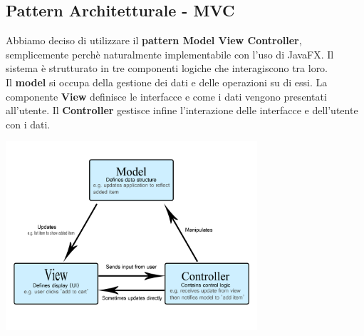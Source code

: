 \documentclass[11pt]{article}
\begin{document}
    \subsection{Pattern Architetturale - MVC}
    Abbiamo deciso di utilizzare il \textbf{pattern Model View Controller}, semplicemente perchè naturalmente implementabile con l'uso di JavaFX. Il sistema è strutturato in tre componenti logiche che interagiscono tra loro.\\
    Il \textbf{model} si occupa della gestione dei dati e delle operazioni su di essi. La componente \textbf{View} definisce le interfacce e come i dati vengono presentati all'utente. Il \textbf{Controller} 
    gestisce infine l'interazione delle interfacce e dell'utente con i dati.
        \begin{center}
            \includegraphics[width=0.70\textwidth]{pictures/mvc.png}
        \end{center}
		
\newpage
\end{document}
